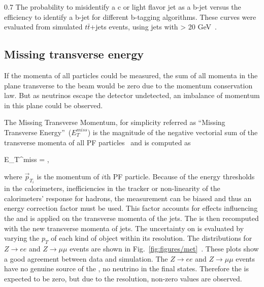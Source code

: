                  {0.7}       %
                 { The probability to misidentify a c or light flavor jet as a b-jet versus the efficiency to identify a b-jet for different b-tagging algorithms. These curves were evaluated from simulated $t\bar{t}$+jets events, using jets with \pt > 20 GeV~\cite{Sirunyan:2017ezt}. }


\subsection{Missing transverse energy~\label{sec:MET}}


If the momenta of all particles could be measured, the sum of all momenta in the plane transverse to the beam would be zero due to the momentum conservation law. But as neutrinos escape the detector undetected, an imbalance of momentum in this plane could be observed. 

The Missing Transverse Momentum, for simplicity referred as ``Missing Transverse Energy''~($E_{T}^{miss}$) is the magnitude of the negative vectorial sum of the transverse momenta of all PF particles~\cite{CMS:2016ljj} and is computed as

{
E_{T}^{miss} = ,
}

where $\vec{p}_{T_{i}}$ is the momentum of $i$th PF particle. Because of the energy thresholds in the calorimeters, inefficiencies in the tracker or non-linearity of the calorimeters' response for hadrons, the \MET measurement can be biased and thus an energy correction factor must be used. This factor accounts for effects influencing the \MET and is applied on the transverse momenta of the jets. The \MET is then recomputed with the new transverse momenta of jets. The uncertainty on \MET is evaluated by varying the $p_{T}$ of each kind of object within its resolution. The  \MET  distributions for  $Z \rightarrow ee$ and $Z \rightarrow \mu \mu$ events are shown in Fig.~\ref{fig:figures/met}~\cite{CMS:2016ljj}. These plots show a good agreement between data and simulation. The $Z \rightarrow ee$ and $Z \rightarrow \mu \mu$ events have no genuine source of the \MET , no neutrino in the final states. Therefore the \MET is expected to be zero, but due to the \MET resolution, non-zero values are observed.  


